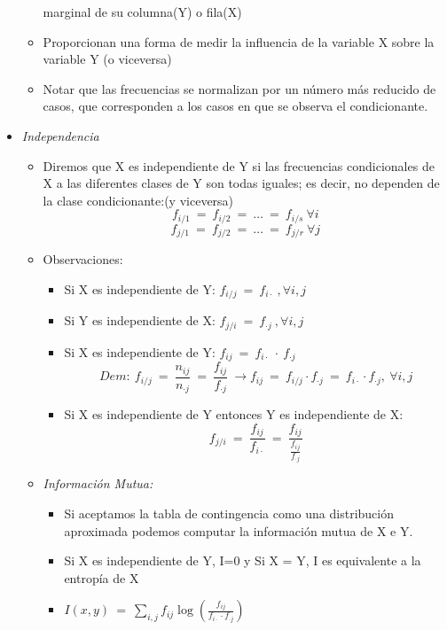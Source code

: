 \begin{itemize}
\begin{itemize}
			 marginal de su columna(Y) o fila(X)
			\item Proporcionan una forma de medir la influencia de la variable X sobre la variable Y (o viceversa)
			\item Notar que las frecuencias se normalizan por un n\'umero m\'as reducido de casos, que corresponden a los 
			casos en que se observa el condicionante. 
		\end{itemize}
		\item \emph{Independencia}
			\begin{itemize}
				\item Diremos que X es independiente de Y si las frecuencias condicionales de X a las diferentes clases de Y son
				 todas iguales; es decir, no dependen de la clase condicionante:(y viceversa)
				$$f_{i/1}\ =\ f_{i/2}\ =\ \ldots\ =\ f_{i/s}\ \forall i$$
				$$f_{j/1}\ =\ f_{j/2}\ =\ \ldots\ =\ f_{j/r}\ \forall j$$
				\item Observaciones:
				\begin{itemize}
					\item Si X es independiente de Y: $f_{i/j}\ =\ f_{i\cdot}\ ,\forall i,j$
					\item Si Y es independiente de X: $f_{j/i}\ =\ f_{\cdot j}\ ,\forall i,j$
					\item Si X es independiente de Y: $f_{ij}\ =\ f_{i\cdot}\ \cdot\ f_{\cdot j}$
					 $$Dem:\ f_{i/j}\ =\ \frac{n_{ij}}{n_{\cdot j}}\ =\ \frac{f_{ij}}{f_{\cdot j}}\ \rightarrow f_{ij}\ =\ 
					f_{i/j}\cdot f_{\cdot j}\ =\ f_{i\cdot}\cdot f_{\cdot j},\ \forall i,j$$
					\item Si X es independiente de Y entonces Y es independiente de X: 
					$$f_{j/i}\ =\ \frac{f_{ij}}{f_{i\cdot}}\ =\ \frac{f_{ij}}{\frac{f_{ij}}{f_{\cdot j}}}$$
				\end{itemize}
				\item \emph{Informaci\'on Mutua:} 
				\begin{itemize}
					\item Si aceptamos la tabla de contingencia como una distribuci\'on aproximada podemos
					 computar la información mutua de X e Y.
					\item  Si X es independiente de Y, I=0 y  Si X = Y, I es equivalente a la entropía de X
					\item $I(x,y)\ =\ \sum_{i,j}f_{ij}\log\left(\frac{f_{ij}}{f_{i\cdot}\cdot f_{\cdot j}}\right)$
				\end{itemize}
			\end{itemize}
	\end{itemize}
